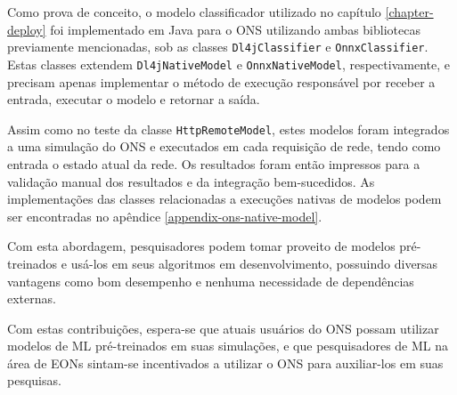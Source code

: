 Como prova de conceito, o modelo classificador utilizado no capítulo \ref{chapter-deploy} foi implementado em Java para o ONS utilizando ambas bibliotecas previamente mencionadas, sob as classes \texttt{Dl4jClassifier} e \texttt{OnnxClassifier}. Estas classes extendem \texttt{Dl4jNativeModel} e \texttt{OnnxNativeModel}, respectivamente, e precisam apenas implementar o método de execução responsável por receber a entrada, executar o modelo e retornar a saída.

Assim como no teste da classe \texttt{HttpRemoteModel}, estes modelos foram integrados a uma simulação do ONS e executados em cada requisição de rede, tendo como entrada o estado atual da rede. Os resultados foram então impressos para a validação manual dos resultados e da integração bem-sucedidos. As implementações das classes relacionadas a execuções nativas de modelos podem ser encontradas no apêndice \ref{appendix-ons-native-model}.

Com esta abordagem, pesquisadores podem tomar proveito de modelos pré-treinados e usá-los em seus algoritmos em desenvolvimento, possuindo diversas vantagens como bom desempenho e nenhuma necessidade de dependências externas.

Com estas contribuições, espera-se que atuais usuários do ONS possam utilizar modelos de ML pré-treinados em suas simulações, e que pesquisadores de ML na área de EONs sintam-se incentivados a utilizar o ONS para auxiliar-los em suas pesquisas.
